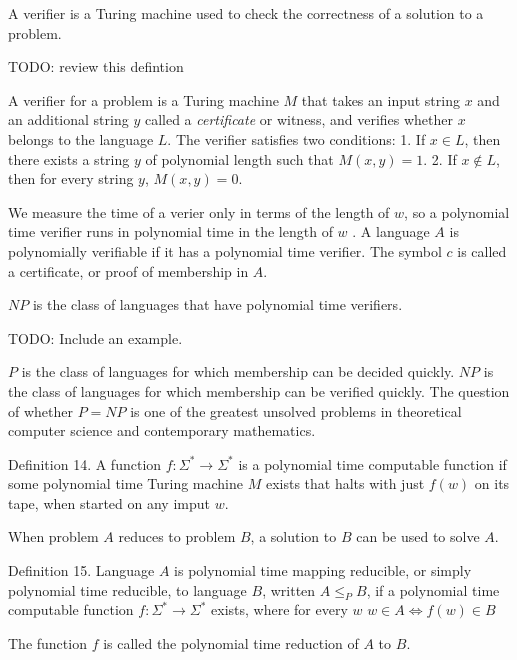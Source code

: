 A verifier is a Turing machine used to check the correctness of a solution to a problem.

{\color{red} TODO: review this defintion}

\begin{definition}
A verifier for a problem is a Turing machine $M$ that takes an input string $x$ and an additional string $y$ called a \emph{certificate} or witness, and verifies whether $x$ belongs to the language \(L\). The verifier satisfies two conditions:
1. If \(x \in L\), then there exists a string \(y\) of polynomial length such that \(M(x, y) = 1\).
2. If \(x \notin L\), then for every string \(y\), \(M(x, y) = 0\).
\end{definition}

{\color{red} We measure the time of a verier only in terms of the length of $w$, so a polynomial time verifier runs in polynomial time in the length of $w$
. A language $A$ is polynomially verifiable if it has a polynomial time verifier. The symbol $c$ is called a certificate, or proof of membership in $A$.}

{\color{red}
\begin{definition}
$NP$ is the class of languages that have polynomial time verifiers.
\end{definition}
}


{\color{red} TODO: Include an example.}

{\color{red} $P$ is the class of languages for which membership can be decided quickly. $NP$ is the class of languages for which membership can be verified quickly. The question of whether $P=NP$ is one of the greatest unsolved problems in theoretical computer science and contemporary mathematics.}

Definition 14. A function $f:\Sigma^{\ast}\rightarrow\Sigma^{\ast}$ is a polynomial time computable function if some polynomial time Turing machine $M$ exists that halts with just $f(w)$ on its tape, when started on any imput $w$.

When problem $A$ reduces to problem $B$, a solution to $B$ can be used to solve $A$.

Definition 15. Language $A$ is polynomial time mapping reducible, or simply polynomial time reducible, to language $B$, written $A\leq_{P}B$, if a polynomial time computable function $f:\Sigma^{\ast}\rightarrow\Sigma^{\ast}$ exists, where for every $w$ $w\in A\iff f(w)\in B$

The function $f$ is called the polynomial time reduction of $A$ to $B$.

